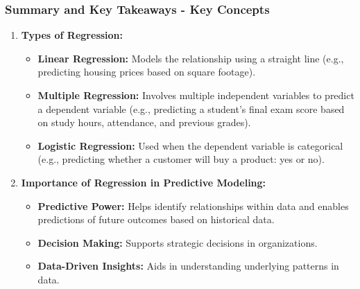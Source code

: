 \documentclass{beamer}
\begin{document}
\begin{frame}[fragile]
    \frametitle{Summary and Key Takeaways - Key Concepts}
    \begin{enumerate}
        \item \textbf{Types of Regression:}
            \begin{itemize}
                \item \textbf{Linear Regression:} Models the relationship using a straight line (e.g., predicting housing prices based on square footage).
                \item \textbf{Multiple Regression:} Involves multiple independent variables to predict a dependent variable (e.g., predicting a student’s final exam score based on study hours, attendance, and previous grades).
                \item \textbf{Logistic Regression:} Used when the dependent variable is categorical (e.g., predicting whether a customer will buy a product: yes or no).
            \end{itemize}
        
        \item \textbf{Importance of Regression in Predictive Modeling:}
            \begin{itemize}
                \item \textbf{Predictive Power:} Helps identify relationships within data and enables predictions of future outcomes based on historical data.
                \item \textbf{Decision Making:} Supports strategic decisions in organizations.
                \item \textbf{Data-Driven Insights:} Aids in understanding underlying patterns in data.
            \end{itemize}
    \end{enumerate}
\end{frame}
\end{document}
